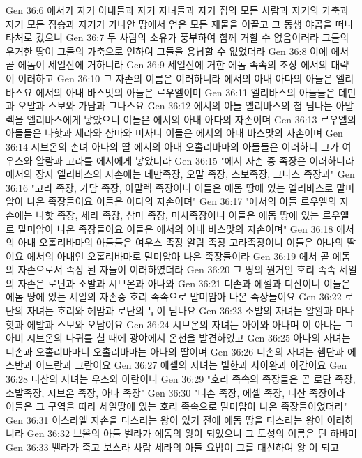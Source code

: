 Gen 36:6  에서가 자기 아내들과 자기 자녀들과 자기 집의 모든 사람과 자기의 가축과 자기 모든 짐승과 자기가 가나안 땅에서 얻은 모든 재물을 이끌고 그 동생 야곱을 떠나 타처로 갔으니
Gen 36:7  두 사람의 소유가 풍부하여 함께 거할 수 없음이러라 그들의 우거한 땅이 그들의 가축으로 인하여 그들을 용납할 수 없었더라
Gen 36:8  이에 에서 곧 에돔이 세일산에 거하니라
Gen 36:9  세일산에 거한 에돔 족속의 조상 에서의 대략이 이러하고
Gen 36:10  그 자손의 이름은 이러하니라 에서의 아내 아다의 아들은 엘리바스요 에서의 아내 바스맛의 아들은 르우엘이며
Gen 36:11  엘리바스의 아들들은 데만과 오말과 스보와 가담과 그나스요
Gen 36:12  에서의 아들 엘리바스의 첩 딤나는 아말렉을 엘리바스에게 낳았으니 이들은 에서의 아내 아다의 자손이며
Gen 36:13  르우엘의 아들들은 나핫과 세라와 삼마와 미사니 이들은 에서의 아내 바스맛의 자손이며
Gen 36:14  시브온의 손녀 아나의 딸 에서의 아내 오홀리바마의 아들들은 이러하니 그가 여우스와 얄람과 고라를 에서에게 낳았더라
Gen 36:15  "에서 자손 중 족장은 이러하니라 에서의 장자 엘리바스의 자손에는 데만족장, 오말 족장, 스보족장, 그나스 족장과"
Gen 36:16  "고라 족장, 가담 족장, 아말렉 족장이니 이들은 에돔 땅에 있는 엘리바스로 말미암아 나온 족장들이요 이들은 아다의 자손이며"
Gen 36:17  "에서의 아들 르우엘의 자손에는 나핫 족장, 세라 족장, 삼마 족장, 미사족장이니 이들은 에돔 땅에 있는 르우엘로 말미암아 나온 족장들이요 이들은 에서의 아내 바스맛의 자손이며"
Gen 36:18  에서의 아내 오홀리바마의 아들들은 여우스 족장 얄람 족장 고라족장이니 이들은 아나의 딸이요 에서의 아내인 오홀리바마로 말미암아 나온 족장들이라
Gen 36:19  에서 곧 에돔의 자손으로서 족장 된 자들이 이러하였더라
Gen 36:20  그 땅의 원거인 호리 족속 세일의 자손은 로단과 소발과 시브온과 아나와
Gen 36:21  디손과 에셀과 디산이니 이들은 에돔 땅에 있는 세일의 자손중 호리 족속으로 말미암아 나온 족장들이요
Gen 36:22  로단의 자녀는 호리와 헤맘과 로단의 누이 딤나요
Gen 36:23  소발의 자녀는 알완과 마나핫과 에발과 스보와 오남이요
Gen 36:24  시브온의 자녀는 아야와 아나며 이 아나는 그 아비 시브온의 나귀를 칠 때에 광야에서 온천을 발견하였고
Gen 36:25  아나의 자녀는 디손과 오홀리바마니 오홀리바마는 아나의 딸이며
Gen 36:26  디손의 자녀는 헴단과 에스반과 이드란과 그란이요
Gen 36:27  에셀의 자녀는 빌한과 사아완과 아간이요
Gen 36:28  디산의 자녀는 우스와 아란이니
Gen 36:29  "호리 족속의 족장들은 곧 로단 족장, 소발족장, 시브온 족장, 아나 족장"
Gen 36:30  "디손 족장, 에셀 족장, 디산 족장이라 이들은 그 구역을 따라 세일땅에 있는 호리 족속으로 말미암아 나온 족장들이었더라"
Gen 36:31  이스라엘 자손을 다스리는 왕이 있기 전에 에돔 땅을 다스리는 왕이 이러하니라
Gen 36:32  브올의 아들 벨라가 에돔의 왕이 되었으니 그 도성의 이름은 딘 하바며
Gen 36:33  벨라가 죽고 보스라 사람 세라의 아들 요밥이 그를 대신하여 왕 이 되고
